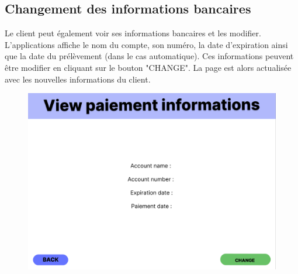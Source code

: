 \subsection{Changement des informations bancaires}
\begin{flushleft}
Le client peut également voir ses informations bancaires et les modifier. L'applications affiche le nom du compte, son numéro, la date d'expiration ainsi que la date du prélèvement (dans le cas automatique). Ces informations peuvent être modifier en cliquant sur le bouton "CHANGE". La page est alors actualisée avec les nouvelles informations du client.
\end{flushleft}
\begin{figure}[h]
\centering
\includegraphics[width = 1\textwidth]{extension-maxime/interface/img/paiement-informations.png}
\end{figure}
